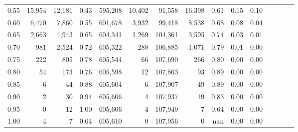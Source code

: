 \begin{tabular}{rrrcrrrrrrrrrrr}
0.55 &   15,954 &  12,181 &                                       0.43 &  595,208 &   10,402 &   91,558 &   16,398 &  0.61 &  0.15 &                         0.10 \\
0.60 &    6,470 &   7,860 &                                       0.55 &  601,678 &    3,932 &   99,418 &    8,538 &  0.68 &  0.08 &                         0.04 \\
0.65 &    2,663 &   4,943 &                                       0.65 &  604,341 &    1,269 &  104,361 &    3,595 &  0.74 &  0.03 &                         0.01 \\
0.70 &      981 &   2,524 &                                       0.72 &  605,322 &      288 &  106,885 &    1,071 &  0.79 &  0.01 &                         0.00 \\
0.75 &      222 &     805 &                                       0.78 &  605,544 &       66 &  107,690 &      266 &  0.80 &  0.00 &                         0.00 \\
0.80 &       54 &     173 &                                       0.76 &  605,598 &       12 &  107,863 &       93 &  0.89 &  0.00 &                         0.00 \\
0.85 &        6 &      44 &                                       0.88 &  605,604 &        6 &  107,907 &       49 &  0.89 &  0.00 &                         0.00 \\
0.90 &        2 &      30 &                                       0.94 &  605,606 &        4 &  107,937 &       19 &  0.83 &  0.00 &                         0.00 \\
0.95 &        0 &      12 &                                       1.00 &  605,606 &        4 &  107,949 &        7 &  0.64 &  0.00 &                         0.00 \\
1.00 &        4 &       7 &                                       0.64 &  605,610 &        0 &  107,956 &        0 &   nan &  0.00 &                         0.00 \\
\bottomrule
\end{tabular}
